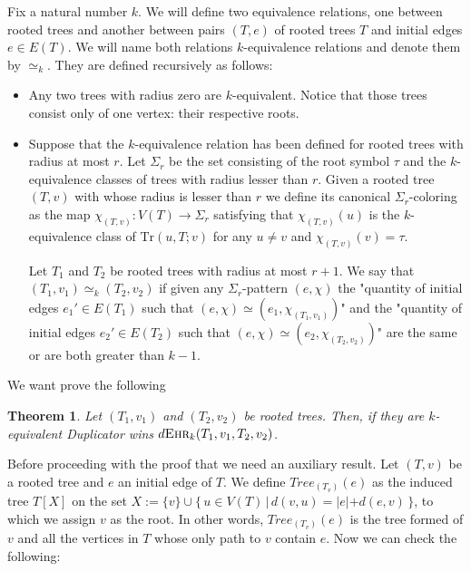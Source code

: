 \documentclass[12pt,notitlepage,a4paper]{article}
\newtheorem{theorem}{Theorem}[section]
\theoremstyle{definition}
\newcommand{\morph}[1]{\simeq_#1}
\newcommand{\ehr}{\textsc{Ehr}}
\begin{document}
Fix a natural number $k$. We will define 
two equivalence relations, one between 
rooted trees and another between pairs
$(T,e)$ of rooted trees $T$ and initial edges
$e\in E(T)$. We will name both relations
$k$-equivalence relations and
denote them by $\morph{k}$. 
They are defined recursively as follows:

\begin{itemize}
	\item Any two trees with radius zero are $k$-equivalent.
	Notice that those trees
	consist only of one vertex: their respective roots.
	\item Suppose that the $k$-equivalence relation has been
	defined for rooted trees with radius at most $r$. Let $\Sigma_r$
	be the set consisting of the root symbol $\tau$ and
	the $k$-equivalence classes of trees with radius lesser than $r$.
	Given a rooted tree $(T,v)$ with whose radius is lesser than $r$
	we define its canonical $\Sigma_r$-coloring as the map 
	$\chi_{(T,v)}: V(T)\rightarrow \Sigma_r$ satisfying that
	$\chi_{(T,v)}(u)$ is the $k$-equivalence class of $\mathrm{Tr}(u,T;v)$
	for any $u\neq v$ and $\chi_{(T,v)}(v)=\tau$. \par
	Let $T_1$ and $T_2$ be rooted trees with radius
	at most $r+1$. We say that $(T_1,v_1)\simeq_k (T_2,v_2)$ 
	if given any $\Sigma_r$-pattern $(e,\chi)$ the 
	"quantity of initial edges $e_1\prime\in E(T_1)$ such that
	$(e,\chi)\simeq (e_1,\chi_{(T_1,v_1)})$" and the
	"quantity of initial edges $e_2\prime\in E(T_2)$ such that
	$(e,\chi)\simeq (e_2,\chi_{(T_2,v_2)})$" are the same or
	are both greater than $k-1$.
\end{itemize}

We want prove the following
\begin{theorem} \label{thm:equivalenttrees} 
	Let $(T_1,v_1)$ and $(T_2,v_2)$ be rooted trees.
	Then, if they are $k$-equivalent Duplicator wins
	$d\ehr_{k}(T_1,v_1,T_2,v_2)$.
\end{theorem}

Before proceeding with the proof that we need an auxiliary
result. Let $(T,v)$ be a rooted tree and $e$ an 
initial edge of $T$. We define $Tree_{(T_v)}(e)$ as
the induced tree $T[X]$ on the set
$X:=\{v\} \cup \{\, u\in V(T) \, | \, d(v,u) = |e| + d(e,v) \,\}$,
to which we assign $v$ as the root. In other words, 
$Tree_{(T_v)}(e)$ is the tree formed of $v$ and all the vertices
in $T$ whose only path to $v$ contain $e$. 
Now we can check the following:
\end{document}
